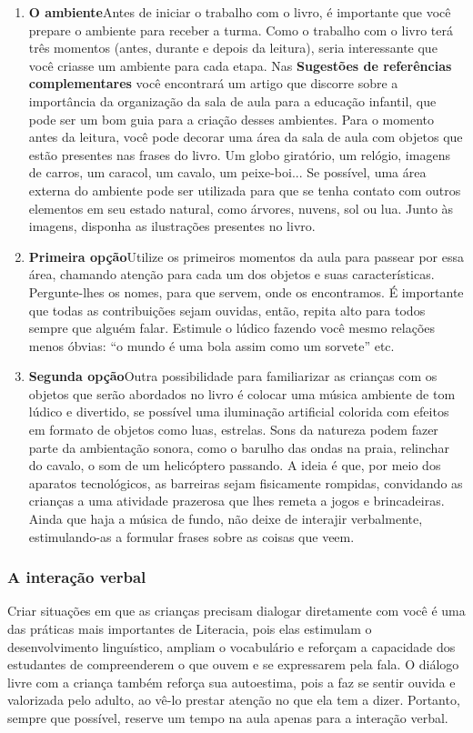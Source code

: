\documentclass[11pt]{extarticle}
\begin{document}
\begin{enumerate}
\item \textbf{O ambiente}\quad Antes de iniciar o trabalho com o livro, é importante que você 
prepare o ambiente para receber a turma. Como o trabalho com o livro terá 
três momentos (antes, durante e depois da leitura), seria interessante que você 
criasse um ambiente para cada etapa. Nas \textbf{Sugestões de referências complementares} 
você encontrará um artigo que discorre sobre a importância da organização da sala 
de aula para a educação infantil, que pode ser um bom guia para a criação desses 
ambientes. Para o momento antes da leitura, você pode decorar 
uma área da sala de aula com objetos que estão presentes nas frases do livro.
Um globo giratório, um relógio, imagens de carros, um caracol, um cavalo, um peixe-boi... 
Se possível, uma área externa do ambiente pode ser utilizada para que se tenha contato 
com outros elementos em seu estado natural, como árvores, nuvens, sol ou lua.
Junto às imagens, disponha as ilustrações presentes no livro. 

\item \textbf{Primeira opção}\quad Utilize os primeiros 
momentos da aula para passear por essa área, chamando atenção para cada um 
dos objetos e suas características. Pergunte-lhes os nomes, para que servem, 
onde os encontramos. É importante que todas as contribuições sejam ouvidas, então,
repita alto para todos sempre que alguém falar. Estimule o lúdico fazendo você
mesmo relações menos óbvias: ``o mundo é uma bola assim como um sorvete'' etc.

\item \textbf{Segunda opção}\quad Outra possibilidade para familiarizar 
as crianças com os objetos que serão abordados no livro é colocar uma música ambiente
de tom lúdico e divertido, se possível uma iluminação artificial colorida com 
efeitos em formato de objetos como luas, estrelas. Sons da natureza podem 
fazer parte da ambientação sonora, como o barulho das ondas na praia, relinchar 
do cavalo, o som de um helicóptero passando. A ideia é que, por meio dos 
aparatos tecnológicos, as barreiras sejam fisicamente rompidas, 
convidando as crianças a uma atividade prazerosa que lhes remeta a jogos
e brincadeiras. Ainda que haja a música de fundo, não deixe de interajir verbalmente,
estimulando-as a formular frases sobre as coisas que veem.
\end{enumerate}


\subsubsection{A interação verbal} 
Criar situações em que as crianças precisam dialogar diretamente com 
você é uma das práticas mais importantes de Literacia, pois elas estimulam 
o desenvolvimento linguístico, ampliam o vocabulário e reforçam a 
capacidade dos estudantes de compreenderem o que ouvem e se expressarem 
pela fala. O diálogo livre com a criança também reforça sua autoestima, pois 
a faz se sentir ouvida e valorizada pelo adulto, ao vê-lo prestar atenção 
no que ela tem a dizer. Portanto, sempre que possível, reserve um tempo na 
aula apenas para a interação verbal. 
\end{document}
